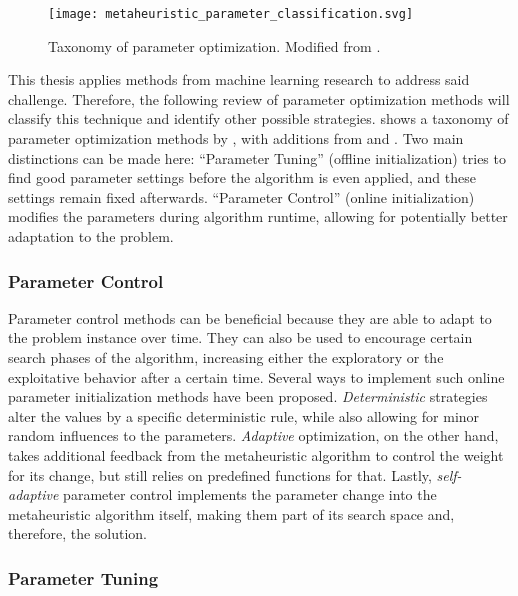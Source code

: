 \begin{figure}[h]
	\centering
	\texttt{[image: metaheuristic\_parameter\_classification.svg]}
	\caption[Taxonomy of parameter optimization]{Taxonomy of parameter optimization. Modified from \citet{eiben1999parameter}.}
	\label{fig:paramtax}
\end{figure}

This thesis applies methods from machine learning research to address said challenge. Therefore, the following review of parameter optimization methods will classify this technique and identify other possible strategies.  shows a taxonomy of parameter optimization methods by \citet{eiben1999parameter}, with additions from \citet{talbi2009metaheuristics} and \citet{stutzle2012parameter}. Two main distinctions can be made here: \enquote{Parameter Tuning} (offline initialization) tries to find good parameter settings before the algorithm is even applied, and these settings remain fixed afterwards. \enquote{Parameter Control} (online initialization) modifies the parameters during algorithm runtime, allowing for potentially better adaptation to the problem.

\subsubsection{Parameter Control}

Parameter control methods can be beneficial because they are able to adapt to the problem instance over time. They can also be used to encourage certain search phases of the algorithm, increasing either the exploratory or the exploitative behavior after a certain time. Several ways to implement such online parameter initialization methods have been proposed. \textit{Deterministic} strategies alter the values by a specific deterministic rule, while also allowing for minor random influences to the parameters. \textit{Adaptive} optimization, on the other hand, takes additional feedback from the metaheuristic algorithm to control the weight for its change, but still relies on predefined functions for that. Lastly, \textit{self-adaptive} parameter control implements the parameter change into the metaheuristic algorithm itself, making them part of its search space and, therefore, the solution.

\subsubsection{Parameter Tuning}

